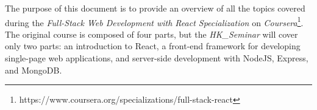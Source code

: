 \documentclass[twoside]{supsistudent}
\begin{document}
\maketitle
\onehalfspacing
\frontmatter



\newpage
\mainmatter
{}
\setcounter{page}{1}

The purpose of this document is to provide an overview of all the topics covered during the \textit{Full-Stack Web Development with React Specialization} on \textit{Coursera}\footnote{https://www.coursera.org/specializations/full-stack-react}. The original course is composed of four parts, but the \textit{HK\_Seminar} will cover only two parts: an introduction to React, a front-end framework for developing single-page web applications, and server-side development with NodeJS, Express, and MongoDB.



% 
% 
\end{document}
